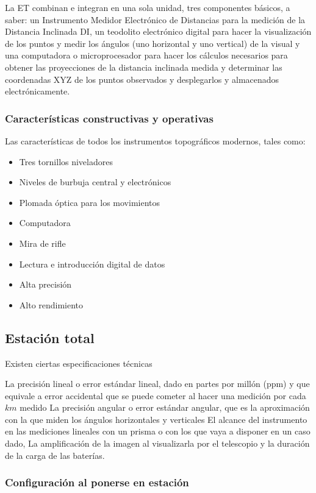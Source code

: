 La ET combinan e integran en una sola unidad, tres componentes básicos, a saber: un Instrumento Medidor Electrónico de Distancias para la medición de la Distancia Inclinada DI, un teodolito electrónico digital para hacer la visualización de los puntos y medir los ángulos (uno horizontal y uno vertical) de la visual y una computadora o microprocesador para hacer los cálculos necesarios para obtener las proyecciones de la distancia inclinada medida y determinar las coordenadas XYZ de los puntos observados y desplegarlos y almacenados electrónicamente.


\subsubsection{Características constructivas y operativas}
Las características de todos los instrumentos topográficos modernos, tales como:
\begin{itemize}
    \item Tres tornillos niveladores
    \item Niveles de burbuja central y electrónicos
    \item Plomada óptica para los movimientos
    \item Computadora
    \item Mira de rifle
    \item Lectura e introducción digital de datos
    \item Alta precisión
    \item Alto rendimiento
\end{itemize}

\subsection{Estación total}

Existen ciertas especificaciones técnicas

La precisión lineal o error estándar lineal, dado en partes por millón (ppm) y que equivale a error accidental que se puede cometer al hacer una medición por cada $km$ medido
La precisión angular o error estándar angular, que es la aproximación con la que miden los ángulos horizontales y verticales
El alcance del instrumento en las mediciones lineales con un prisma o con los que vaya a disponer en un caso dado,
La amplificación de la imagen al visualizarla por el telescopio y la duración de la carga de las baterías.

\subsubsection{Configuración al ponerse en estación}

